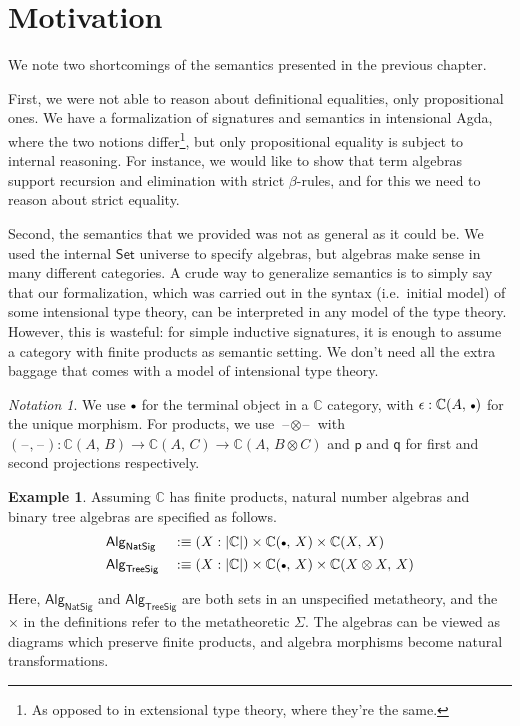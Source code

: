 \documentclass[12pt,a4paper,twoside,openany]{book}
\theoremstyle{remark}
\newtheorem{notation}{Notation}
\theoremstyle{definition}
\newtheorem{myexample}{Example}
\newcommand{\ms}[1]{\mathsf{#1}}
\newcommand{\mbb}[1]{\mathbb{#1}}
\newcommand{\blank}{\mathord{\hspace{1pt}\text{--}\hspace{1pt}}}
\newcommand{\Set}{\mathsf{Set}}
\newcommand{\emptycon}{\scaleobj{.75}\bullet}
\newcommand{\p}{\mathsf{p}}
\newcommand{\q}{\mathsf{q}}
\newcommand{\Alg}{\ms{Alg}}
\newcommand{\mbbC}{\mbb{C}}
\newcommand{\defn}{:\equiv}
\begin{document}
\section{Motivation}
\label{sec:2ltt-motivation}
We note two shortcomings of the semantics presented in the
previous chapter.

First, we were not able to reason about definitional equalities, only
propositional ones. We have a formalization of signatures and semantics in
intensional Agda, where the two notions differ\footnote{As opposed to in
extensional type theory, where they're the same.}, but only propositional
equality is subject to internal reasoning. For instance, we would like to show
that term algebras support recursion and elimination with strict $\beta$-rules,
and for this we need to reason about strict equality.

Second, the semantics that we provided was not as general as it could be. We
used the internal $\Set$ universe to specify algebras, but algebras make sense
in many different categories. A crude way to generalize semantics is to simply
say that our formalization, which was carried out in the syntax (i.e.\ initial
model) of some intensional type theory, can be interpreted in any model of the
type theory. However, this is wasteful: for simple inductive signatures, it is
enough to assume a category with finite products as semantic setting. We don't
need all the extra baggage that comes with a model of intensional type theory.

\begin{notation}
We use $\emptycon$ for the terminal object in a $\mbb{C}$ category, with
$\epsilon : \mbb{C}(A,\,\emptycon)$ for the unique morphism. For products, we
use $\blank\!\otimes\!\blank$ with $(\blank\!,\!\blank) : \mbb{C}(A,\,B) \to
\mbb{C}(A,\,C) \to \mbb{C}(A,\,B\otimes C)$ and $\p$ and $\q$ for
first and second projections respectively.
\end{notation}

\begin{myexample}
Assuming $\mbbC$ has finite products, natural number algebras and binary tree
algebras are specified as follows.
\begin{alignat*}{3}
  &\Alg_{\ms{NatSig}} &&\defn (X : |\mbbC|) \times \mbbC(\emptycon,\,X) \times \mbbC(X,\,X)\\
  &\Alg_{\ms{TreeSig}}&& \defn (X : |\mbbC|) \times \mbbC(\emptycon,\,X) \times \mbbC(X \otimes X,\,X)
\end{alignat*}
\end{myexample}
Here, $\Alg_{\ms{NatSig}}$ and $\Alg_{\ms{TreeSig}}$ are both sets in an
unspecified metatheory, and the $\times$ in the definitions refer to the
metatheoretic $\Sigma$. The algebras can be viewed as diagrams which preserve
finite products, and algebra morphisms become natural transformations.
\end{document}
